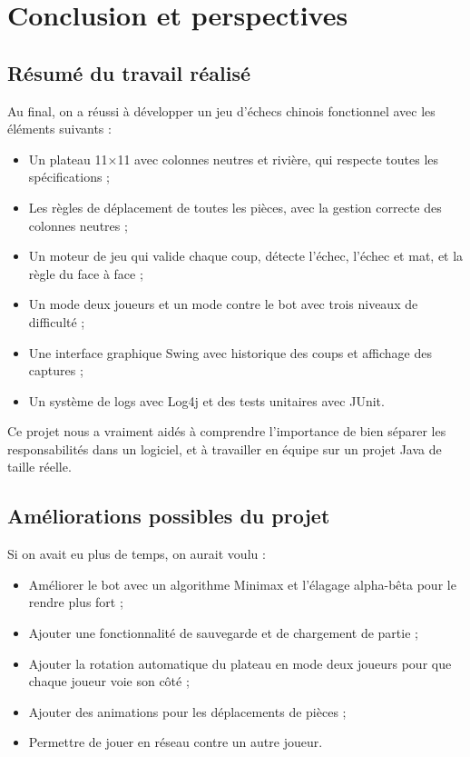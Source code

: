 \newpage
\section{Conclusion et perspectives}
\subsection{Résumé du travail réalisé}
Au final, on a réussi à développer un jeu d'échecs chinois fonctionnel avec les éléments suivants :
\begin{itemize}
\item Un plateau 11×11 avec colonnes neutres et rivière, qui respecte toutes les spécifications ;
\item Les règles de déplacement de toutes les pièces, avec la gestion correcte des colonnes neutres ;
\item Un moteur de jeu qui valide chaque coup, détecte l'échec, l'échec et mat, et la règle du face à face ;
\item Un mode deux joueurs et un mode contre le bot avec trois niveaux de difficulté ;
\item Une interface graphique Swing avec historique des coups et affichage des captures ;
\item Un système de logs avec Log4j et des tests unitaires avec JUnit.
\end{itemize}
Ce projet nous a vraiment aidés à comprendre l'importance de bien séparer les responsabilités dans un logiciel, et à travailler en équipe sur un projet Java de taille réelle.
\subsection{Améliorations possibles du projet}
Si on avait eu plus de temps, on aurait voulu :
\begin{itemize}
\item Améliorer le bot avec un algorithme Minimax et l'élagage alpha-bêta pour le rendre plus fort ;
\item Ajouter une fonctionnalité de sauvegarde et de chargement de partie ;
\item Ajouter la rotation automatique du plateau en mode deux joueurs pour que chaque joueur voie son côté ;
\item Ajouter des animations pour les déplacements de pièces ;
\item Permettre de jouer en réseau contre un autre joueur.
\end{itemize}